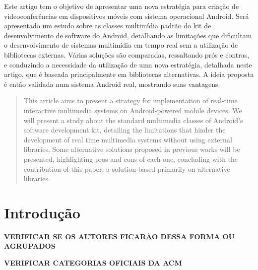 \documentclass{acm_proc_article-sp}
\newcommand{\todo}[1]{\textcolor[rgb]{1.00,0.00,0.00}{\bf \uppercase{#1}}}
\begin{document}
\maketitle
\begin{resumo}
  Este artigo tem o objetivo de apresentar uma nova estratégia para criação de videoconferências em dispositivos móveis com sistema operacional Android. Será apresentado um estudo sobre as classes multimídia padrão do kit de desenvolvimento de software do Android, detalhando as limitações que dificultam o desenvolvimento de sistemas multimídia em tempo real sem a utilização de bibliotecas externas. Várias soluções são comparadas, ressaltando prós e contras, e conduzindo a necessidade da utilização de uma nova estratégia, detalhada neste artigo, que é baseada principalmente em bibliotecas alternativas. A ideia proposta é então validada num sistema Android real, mostrando suas vantagens.
\end{resumo}

\begin{abstract}
  This article aims to present a strategy for implementation of real-time interactive multimedia systems on Android-powered mobile devices. We will present a study about the standard multimedia classes of Android’s software development kit, detailing the limitations that hinder the development of real time multimedia systems without using external libraries. Some alternative solutions proposed in previous works will be presented, highlighting pros and cons of each one, concluding with the contribution of this paper, a solution based primarily on alternative libraries.
\end{abstract}




\section{Introdução}

\todo{verificar se os autores ficarão dessa forma ou agrupados}

\todo{verificar categorias oficiais da acm}
\end{document}

